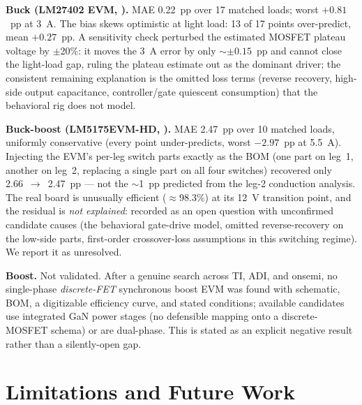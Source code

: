 \documentclass[conference]{IEEEtran}
\begin{document}
\textbf{Buck (LM27402 EVM, \cite{snva406}).} MAE \SI{0.22}{pp} over 17
matched loads; worst $+0.81$~pp at \SI{3}{A}. The bias skews optimistic
at light load: 13 of 17 points over-predict, mean $+0.27$~pp. A
sensitivity check perturbed the estimated MOSFET plateau voltage by
$\pm$20\%: it moves the \SI{3}{A} error by only $\sim\pm 0.15$~pp and
cannot close the light-load gap, ruling the plateau estimate out as the
dominant driver; the consistent remaining explanation is the omitted
loss terms (reverse recovery, high-side output capacitance,
controller/gate quiescent consumption) that the behavioral rig does not
model.

\textbf{Buck-boost (LM5175EVM-HD, \cite{snvu439}).} MAE \SI{2.47}{pp}
over 10 matched loads, uniformly conservative (every point
under-predicts, worst $-2.97$~pp at \SI{5.5}{A}). Injecting the EVM's
per-leg switch parts exactly as the BOM (one part on leg~1, another on
leg~2, replacing a single part on all four switches) recovered only
2.66~$\rightarrow$~2.47~pp --- not the $\sim$1~pp predicted from the
leg-2 conduction analysis. The real board is unusually efficient
($\approx$98.3\%) at its 12~V transition point, and the residual is
\emph{not explained}: recorded as an open question with unconfirmed
candidate causes (the behavioral gate-drive model, omitted
reverse-recovery on the low-side parts, first-order crossover-loss
assumptions in this switching regime). We report it as unresolved.

\textbf{Boost.} Not validated. After a genuine search across TI, ADI,
and onsemi, no single-phase \emph{discrete-FET} synchronous boost EVM
was found with schematic, BOM, a digitizable efficiency curve, and
stated conditions; available candidates use integrated GaN power stages
(no defensible mapping onto a discrete-MOSFET schema) or are
dual-phase. This is stated as an explicit negative result rather than a
silently-open gap.

\section{Limitations and Future Work}
\label{sec:limits}
\end{document}

